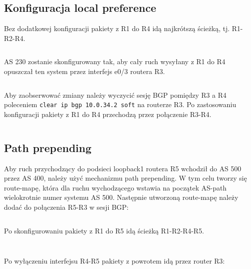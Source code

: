 \documentclass[a4paper,12pt,notitlepage]{article}
\begin{document}
\subsection{Konfiguracja local preference}

Bez dodatkowej konfiguracji pakiety z R1 do R4 idą najkrótszą ścieżką, tj. R1-R2-R4.

\inputminted[label=Komunikacja między R1 i R4 bez local preference, firstline=339, lastline=345]{text}{Routers/R1.txt}%

AS 230 zostanie skonfigurowany tak, aby cały ruch wysyłany z R1 do R4 opuszczał ten system przez interfejs e0/3 routera R3.

\inputminted[label=Ustawianie local preference na R3, firstline=931, lastline=935]{text}{Routers/R3.txt}%

Aby zaobserwować zmiany należy wyczycić sesję BGP pomiędzy R3 a R4 poleceniem \texttt{clear ip bgp 10.0.34.2 soft} na routerze R3. Po zastosowaniu konfiguracji pakiety z R1 do R4 przechodzą przez połączenie R3-R4.

\inputminted[label=Komunikacja między R1 i R4 z local preference, firstline=346, lastline=353]{text}{Routers/R1.txt}%

\subsection{Path prepending}

Aby ruch przychodzący do podsieci loopback1 routera R5 wchodził do AS 500 przez AS 400, należy użyć mechanizmu path prepending. W tym celu tworzy się route-mapę, która dla ruchu wychodzącego wstawia na początek AS-path wielokrotnie numer systemu AS 500. Następnie utworzoną route-mapę należy dodać do połączenia R5-R3 w sesji BGP:

\inputminted[label=Konfiguracja path prepending dla interfejsu R5-R3, firstline=372, lastline=378]{text}{Routers/R5_2.txt}%

Po skonfigurowaniu pakiety z R1 do R5 idą ścieżką R1-R2-R4-R5.

\inputminted[label=Komunikacja między R1 i R5 z path prepending, firstline=533, lastline=540]{text}{Routers/R1.txt}%

\inputminted[label=baza danych BGP na R1, firstline=557, lastline=572]{text}{Routers/R1.txt}%

Po wyłączeniu interfejsu R4-R5 pakiety z powrotem idą przez router R3:

\inputminted[label=Komunikacja między R1 i R5 z path prepending, firstline=573, lastline=580]{text}{Routers/R1.txt}%
\end{document}
